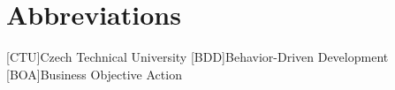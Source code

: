 \section*{Abbreviations}

\begin{acronym}
[CTU]{Czech Technical University}
[BDD]{Behavior-Driven Development}
[BOA]{Business Objective Action}
\end{acronym}
